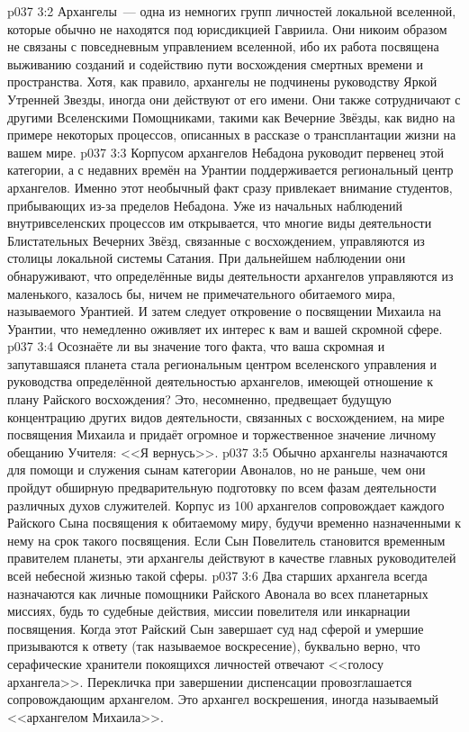 \vs p037 3:2 Архангелы~--- одна из немногих групп личностей локальной вселенной, которые обычно не находятся под юрисдикцией Гавриила. Они никоим образом не связаны с повседневным управлением вселенной, ибо их работа посвящена выживанию созданий и содействию пути восхождения смертных времени и пространства. Хотя, как правило, архангелы не подчинены руководству Яркой Утренней Звезды, иногда они действуют от его имени. Они также сотрудничают с другими Вселенскими Помощниками, такими как Вечерние Звёзды, как видно на примере некоторых процессов, описанных в рассказе о трансплантации жизни на вашем мире.
\vs p037 3:3 \pc Корпусом архангелов Небадона руководит первенец этой категории, а с недавних времён на Урантии поддерживается региональный центр архангелов. Именно этот необычный факт сразу привлекает внимание студентов, прибывающих из-за пределов Небадона. Уже из начальных наблюдений внутривселенских процессов им открывается, что многие виды деятельности Блистательных Вечерних Звёзд, связанные с восхождением, управляются из столицы локальной системы Сатания. При дальнейшем наблюдении они обнаруживают, что определённые виды деятельности архангелов управляются из маленького, казалось бы, ничем не примечательного обитаемого мира, называемого Урантией. И затем следует откровение о посвящении Михаила на Урантии, что немедленно оживляет их интерес к вам и вашей скромной сфере.
\vs p037 3:4 Осознаёте ли вы значение того факта, что ваша скромная и запутавшаяся планета стала региональным центром вселенского управления и руководства определённой деятельностью архангелов, имеющей отношение к плану Райского восхождения? Это, несомненно, предвещает будущую концентрацию других видов деятельности, связанных с восхождением, на мире посвящения Михаила и придаёт огромное и торжественное значение личному обещанию Учителя: <<Я вернусь>>.
\vs p037 3:5 \pc Обычно архангелы назначаются для помощи и служения сынам категории Авоналов, но не раньше, чем они пройдут обширную предварительную подготовку по всем фазам деятельности различных духов служителей. Корпус из 100 архангелов сопровождает каждого Райского Сына посвящения к обитаемому миру, будучи временно назначенными к нему на срок такого посвящения. Если Сын Повелитель становится временным правителем планеты, эти архангелы действуют в качестве главных руководителей всей небесной жизнью такой сферы.
\vs p037 3:6 Два старших архангела всегда назначаются как личные помощники Райского Авонала во всех планетарных миссиях, будь то судебные действия, миссии повелителя или инкарнации посвящения. Когда этот Райский Сын завершает суд над сферой и умершие призываются к ответу (так называемое воскресение), буквально верно, что серафические хранители покоящихся личностей отвечают <<голосу архангела>>. Перекличка при завершении диспенсации провозглашается сопровождающим архангелом. Это архангел воскрешения, иногда называемый <<архангелом Михаила>>.
